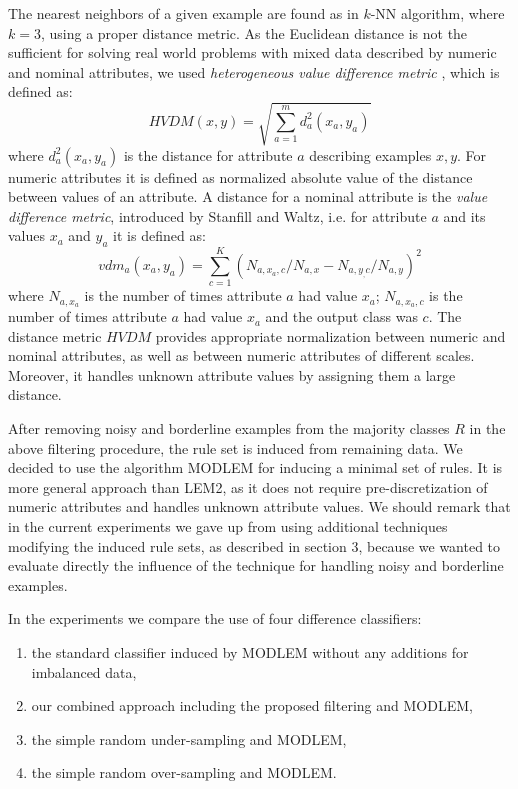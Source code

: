 \documentclass{AIMeth05}
\begin{document}
The nearest neighbors of a given example are found as in $k$-NN algorithm,
where $k =$3, using a proper distance metric. As the Euclidean distance is
not the sufficient for solving real world problems with mixed data described
by numeric and nominal attributes, we used {\em heterogeneous value
difference metric} \cite{Wilson}, which is defined as:
\[
  HVDM(x,y)=\sqrt{\sum_{a=1}^{m}d_a^2(x_a,y_a)}
\]
where $d_a^2(x_a,y_a)$ is the distance for attribute $a$ describing examples
$x, y$. For numeric attributes it is defined as normalized absolute value of
the distance between values of an attribute. A distance for a nominal
attribute is the {\em value difference metric}, introduced by Stanfill and
Waltz, i.e. for attribute $a$ and its values $x_a$ and $y_a$ it is defined
as:
\[
vdm_a(x_a,y_a)=\sum_{c=1}^K(N_{a,x_a,c}/N_{a,x} - N_{a,y_,c}/N_{a,y})^2
\]
where $N_{a,x_a}$ is the number of times attribute $a$ had value $x_a$;
$N_{a,x_a,c}$ is the number of times attribute $a$ had value $x_a$ and the
output class was $c$. The distance metric $HVDM$ provides appropriate
normalization between numeric and nominal attributes, as well as between
numeric attributes of different scales. Moreover, it handles unknown
attribute values by assigning them a large distance.

After removing noisy and borderline examples from the majority classes $R$
in the above filtering procedure, the rule set is induced from remaining
data. We decided to use the algorithm MODLEM \cite{modlem} for inducing a
minimal set of rules. It is more general approach than LEM2, as it does not
require pre-discretization of numeric attributes and  handles unknown
attribute values. We should remark that in the current experiments we gave
up from using additional techniques modifying the induced rule sets, as
described in section 3, because we wanted to evaluate directly the influence
of the technique for handling noisy and borderline examples.

In the experiments we compare the use of four difference classifiers:
\begin{enumerate}
\item the standard classifier induced by MODLEM without any additions for
imbalanced data,
\item our combined approach including the  proposed filtering and MODLEM,
\item the simple random under-sampling and MODLEM,
\item the simple random over-sampling and MODLEM.
\end{enumerate}
\end{document}
